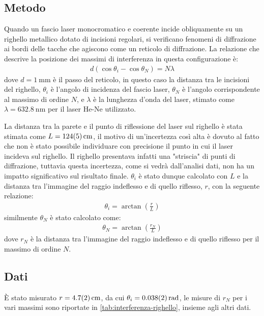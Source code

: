 \documentclass[a4paper]{article}
\begin{document}
\subsection{Metodo}
Quando un fascio laser monocromatico e coerente incide obliquamente su un righello metallico dotato di incisioni regolari, si verificano fenomeni di diffrazione ai bordi delle tacche che agiscono come un reticolo di diffrazione. La relazione che descrive la posizione dei massimi di interferenza in questa configurazione è: 
\begin{align}
    d(\cos\theta_i - \cos\theta_N) = N\lambda
\end{align}
dove $d=\SI{1}{\milli\meter}$ è il passo del reticolo, in questo caso la distanza tra le incisioni del righello, $\theta_i$ è l'angolo di incidenza del fascio laser, $\theta_N$ è l'angolo corrispondente al massimo di ordine $N$, e $\lambda$ è la lunghezza d'onda del laser, stimato come $\lambda=\SI{632.8}{\nano\meter}$ per il laser He-Ne utilizzato.

La distanza tra la parete e il punto di riflessione del laser sul righello è stata stimata come $L=\SI{124 \pm 5}{\centi\meter}$, il motivo di un'incertezza così alta è dovuto al fatto che non è stato possibile individuare con precisione il punto in cui il laser incideva sul righello. Il righello presentava infatti una "striscia" di punti di diffrazione, tuttavia questa incertezza, come si vedrà dall'analisi dati, non ha un impatto significativo sul risultato finale. $\theta_i$ è stato dunque calcolato con $L$ e la distanza tra l'immagine del raggio indeflesso e di quello riflesso, $r$, con la seguente relazione:
\begin{align}   
    \theta_i = \arctan\left(\frac{r}{L}\right)
\end{align}
similmente $\theta_N$ è stato calcolato come:
\begin{align}
    \theta_N = \arctan\left(\frac{r_N}{L}\right)
\end{align}
dove $r_N$ è la distanza tra l'immagine del raggio indeflesso e di quello riflesso per il massimo di ordine $N$.
\subsection{Dati}
È stato misurato $r=\SI{4.7 \pm 0.2}{\centi\meter}$, da cui $\theta_i=\SI{0.038 \pm 0.002}{\radian}$, le misure di $r_N$ per i vari massimi sono riportate in \cref{tab:interferenza-righello}, insieme agli altri dati.
\end{document}
